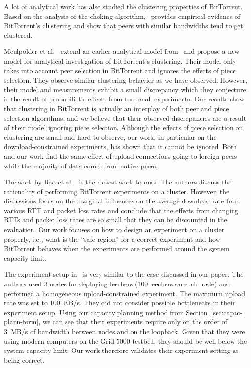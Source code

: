\documentclass[10pt,letterpaper,twocolumn]{article}
\begin{document}
A lot of analytical work has also studied the clustering properties of
BitTorrent. Based on the analysis of the choking
algorithm,~\cite{legout07} provides empirical evidence of BitTorrent's
clustering and show that peers with similar bandwidths tend to get
clustered. 

Meulpolder et al.~\cite{meu09} extend an earlier analytical model
from~\cite{qiu04} and propose a new model for analytical investigation
of BitTorrent's clustering. Their model only takes into account peer
selection in BitTorrent and ignores the effects of piece
selection. They observe similar clustering behavior as we have
observed. However, their model and measurements exhibit a small
discrepancy which they conjecture is the result of probabilistic
effects from too small experiments. Our results show that clustering
in BitTorrent is actually an interplay of both peer and piece
selection algorithms, and we believe that their observed discrepancies
are a result of their model ignoring piece selection. Although the
effects of piece selection on clustering are small and hard to
observe, our work, in particular on the download-constrained
experiments, has shown that it cannot be ignored. Both~\cite{meu09}
and our work find the same effect of upload connections going to
foreign peers while the majority of data comes from native peers.







The work by Rao et al.~\cite{rao10} is the closest work to ours. The
authors discuss the rationality of performing BitTorrent experiments
on a cluster. However, the discussions focus on the marginal
influences on the average download rate from various RTT and packet
loss rates and conclude that the effects from changing RTTs and packet
loss rates are so small that they can be discounted in the
evaluation. Our work focuses on how to design an experiment on a
cluster properly, i.e., what is the ``safe region'' for a correct
experiment and how BitTorrent behaves when the experiments are
performed around the system capacity limit.

The experiment setup in~\cite{rao10} is very similar to the case
discussed in our paper. The authors used 3 nodes for deploying
leechers (100 leechers on each node) and performed a homogeneous
upload-constrained experiment. The maximum upload rate was set to
100~KB/s. They did not consider possible bottlenecks in their
experiment setup. Using our capacity planning method from
Section~\ref{sec:capac-plann-form}, we can see that their experiments
require only on the order of 3~MB/s of bandwidth between nodes and on
the loopback. Given that they were using modern computers on the Grid
5000 testbed, they should be well below the system capacity limit. Our
work therefore validates their experiment setting as being correct.
\end{document}
